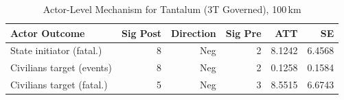 \begin{longtable}{lrrrrr}
\caption{Actor-Level Mechanism for Tantalum (3T Governed), 100\,km} \label{tab:mech_tantalum} \\
\toprule
\textbf{Actor Outcome} & \textbf{Sig Post} & \textbf{Direction} & \textbf{Sig Pre} & \textbf{ATT} & \textbf{SE} \\
\midrule
\endfirsthead
\bottomrule
\endlastfoot
State initiator (fatal.) & 8 & Neg & 2 & 8.1242 & 6.4568 \\
Civilians target (events) & 8 & Neg & 2 & 0.1258 & 0.1584 \\
Civilians target (fatal.) & 5 & Neg & 3 & 8.5515 & 6.6743 \\
\end{longtable}
